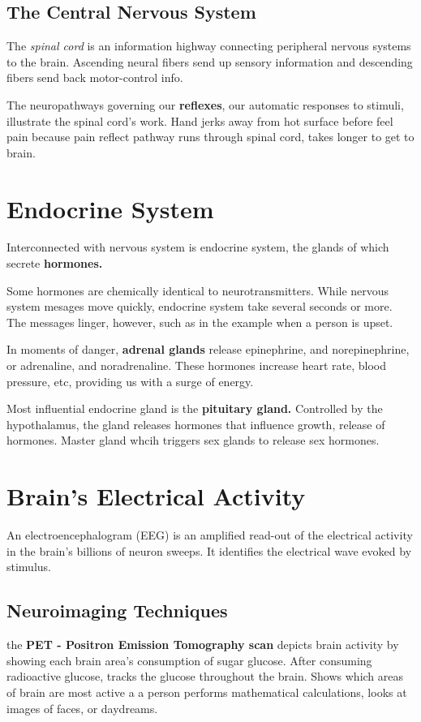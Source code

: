 \subsection*{The Central Nervous System}
The \textit{spinal cord} is an information highway connecting peripheral nervous systems to the brain. Ascending neural fibers send up sensory information and descending fibers send back motor-control info. 

The neuropathways governing our \textbf{reflexes}, our automatic responses to stimuli, illustrate the spinal cord's work. Hand jerks away from hot surface before feel pain because pain reflect pathway runs through spinal cord, takes longer to get to brain.

\section*{Endocrine System}
Interconnected with nervous system is endocrine system, the glands of which secrete \textbf{hormones.} 

Some hormones are chemically identical to neurotransmitters. While nervous system mesages move quickly, endocrine system take several seconds or more. The messages linger, however, such as in the example when a person is upset.

In moments of danger, \textbf{adrenal glands} release epinephrine, and norepinephrine, or adrenaline, and noradrenaline. These hormones increase heart rate, blood pressure, etc, providing us with a surge of energy.

Most influential endocrine gland is the \textbf{pituitary gland.} Controlled by the hypothalamus, the gland releases hormones that influence growth, release of hormones. Master gland whcih triggers sex glands to release sex hormones. 

\section*{Brain's Electrical Activity}
An electroencephalogram (EEG) is an amplified read-out of the electrical activity in the brain's billions of neuron sweeps. It identifies the electrical wave evoked by stimulus.

\subsection*{Neuroimaging Techniques}
the \textbf{PET - Positron Emission Tomography scan} depicts brain activity by showing each brain area's consumption of sugar glucose. After consuming radioactive glucose, tracks the glucose throughout the brain. Shows which areas of brain are most active a a person performs mathematical calculations, looks at images of faces, or daydreams. 

